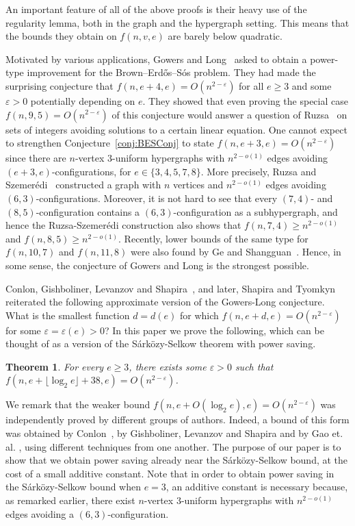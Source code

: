 \documentclass[11pt]{article}
\numberwithin{equation}{section}
\def\eps{\varepsilon}
\theoremstyle{plain}
\newtheorem{theorem}{Theorem}[section]
\theoremstyle{remark}
\begin{document}
An important feature of all of the above proofs is their heavy use of the regularity lemma, both in the graph and the hypergraph setting. This means that the bounds they obtain on $f(n, v, e)$ are barely below quadratic. 

Motivated by various applications, Gowers and Long~\cite{GL21} asked to obtain a power-type improvement for the Brown--Erd\H os--S\'os problem.
They had made the surprising conjecture that $f(n, e+4, e)=O(n^{2-\eps})$ for all $e\geq 3$ and some $\eps>0$ potentially depending on $e$. 
They showed that even proving the special case $f(n,9,5)=O(n^{2-\eps})$ of this conjecture would answer a question of Ruzsa~\cite{ruzsa1993solving} on sets of integers avoiding solutions to a certain linear equation.
One cannot expect to strengthen Conjecture~\ref{conj:BESConj} to state $f(n, e+3, e)=O(n^{2-\eps})$ since there are $n$-vertex $3$-uniform hypergraphs with $n^{2-o(1)}$ edges avoiding $(e+3, e)$-configurations, for $e\in \{3, 4, 5, 7, 8\}$. More precisely, Ruzsa and Szemer\'edi~\cite{RS76} constructed a graph with $n$ vertices and $n^{2-o(1)}$ edges avoiding $(6, 3)$-configurations. Moreover, it is not hard to see that every $(7, 4)$- and $(8, 5)$-configuration contains a $(6, 3)$-configuration as a subhypergraph, and hence the Ruzsa-Szemer\'edi construction also shows that $f(n, 7, 4)\geq n^{2-o(1)}$ and $f(n, 8, 5)\geq n^{2-o(1)}$. Recently, lower bounds of the same type for $f(n, 10, 7)$ and $f(n, 11, 8)$ were also found by Ge and Shangguan~\cite{GS21}. Hence, in some sense, the conjecture of Gowers and Long is the strongest possible.

Conlon, Gishboliner, Levanzov and Shapira~\cite{CGLS23}, and later, Shapira and Tyomkyn~\cite{ST23} reiterated the following approximate version of the Gowers-Long conjecture. 
What is the smallest function $d=d(e)$ for which $f(n, e+d, e)=O(n^{2-\eps})$ for some $\eps = \eps(e)>0$? In this paper we prove the following, which can be thought of as a version of the S\'ark\"ozy-Selkow theorem with power saving.

\begin{theorem}\label{thm:power saving}
For every $e \ge 3$, there exists some $\eps>0$ such that $f(n, e+\lfloor \log_2 e\rfloor+38, e)=O(n^{2-\eps})$.
\end{theorem}

We remark that the weaker bound $f(n,e+O(\log_2 e),e)=O(n^{2-\eps})$ was independently proved by different groups of authors. Indeed, a bound of this form was obtained by Conlon~\cite{Conprivate}, by Gishboliner, Levanzov and Shapira \cite{GLSprivate} and by Gao et. al. \cite{Gaoetal}, using different techniques from one another. The purpose of our paper is to show that we obtain power saving already near the S\'ark\"ozy-Selkow bound, at the cost of a small additive constant. Note that in order to obtain power saving in the S\'ark\"ozy-Selkow bound when $e = 3$, an additive constant is necessary because, as remarked earlier, there exist $n$-vertex $3$-uniform hypergraphs with $n^{2-o(1)}$ edges avoiding a $(6, 3)$-configuration.
\end{document}
